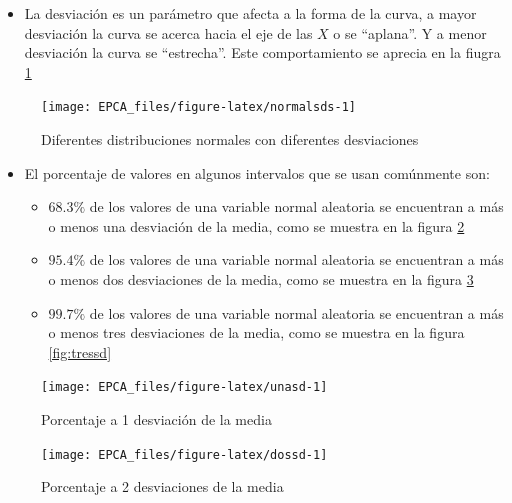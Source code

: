 \documentclass[letterpaper,]{book}
\providecommand{\tightlist}{%
  \setlength{\itemsep}{0pt}\setlength{\parskip}{0pt}}
\begin{document}
\begin{itemize}
\tightlist
\item
  La desviación es un parámetro que afecta a la forma de la curva, a mayor desviación la curva se acerca hacia el eje de las \(X\) o se ``aplana''. Y a menor desviación la curva se ``estrecha''. Este comportamiento se aprecia en la fiugra \ref{fig:normalsds}
\end{itemize}

\begin{figure}[h!]

{\centering \texttt{[image: EPCA\_files/figure-latex/normalsds-1]} 

}

\caption{Diferentes distribuciones normales con diferentes desviaciones}\label{fig:normalsds}
\end{figure}

\begin{itemize}
\tightlist
\item
  El porcentaje de valores en algunos intervalos que se usan comúnmente son:

  \begin{itemize}
  \tightlist
  \item
    \(68.3\%\) de los valores de una variable normal aleatoria se encuentran a más o menos una desviación de la media, como se muestra en la figura \ref{fig:unasd}
  \item
    \(95.4\%\) de los valores de una variable normal aleatoria se encuentran a más o menos dos desviaciones de la media, como se muestra en la figura \ref{fig:dossd}
  \item
    \(99.7\%\) de los valores de una variable normal aleatoria se encuentran a más o menos tres desviaciones de la media, como se muestra en la figura \ref{fig:tressd}
  \end{itemize}
\end{itemize}

\begin{figure}[h!]

{\centering \texttt{[image: EPCA\_files/figure-latex/unasd-1]} 

}

\caption{Porcentaje a 1 desviación de la media}\label{fig:unasd}
\end{figure}

\begin{figure}[h!]

{\centering \texttt{[image: EPCA\_files/figure-latex/dossd-1]} 

}

\caption{Porcentaje a 2 desviaciones de la media}\label{fig:dossd}
\end{figure}
\end{document}
